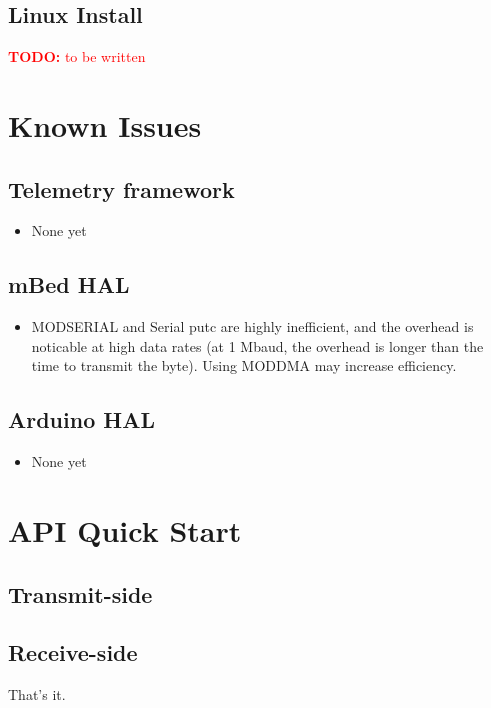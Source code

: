 \documentclass[11pt]{article}
\newcommand{\todo}[1]{\textcolor{red}{\textbf{TODO:} #1}}
\begin{document}
\subsection{Linux Install}
\todo{to be written}

\section{Known Issues}
\subsection{Telemetry framework}
\begin{itemize}
  \item None yet
\end{itemize}

\subsection{mBed HAL}
\begin{itemize}
  \item MODSERIAL and Serial putc are highly inefficient, and the overhead is noticable at high data rates (at 1 Mbaud, the overhead is longer than the time to transmit the byte). Using MODDMA may increase efficiency.
\end{itemize}

\subsection{Arduino HAL}
\begin{itemize}
  \item None yet
\end{itemize}

\section{API Quick Start}
\subsection{Transmit-side}

\subsection{Receive-side}

That's it.
\end{document}
